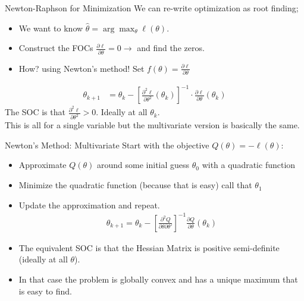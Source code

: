 \documentclass[aspectratio=169]{beamer}
\begin{document}
\begin{frame}{Newton-Raphson for Minimization}
We can re-write \alert{optimization} as \alert{root finding};
\begin{itemize}
\item We want to know $\hat{\theta} = \arg \max_{\theta} \ell(\theta)$.
\item Construct the FOCs $\frac{\partial \ell}{\partial \theta}=0 \rightarrow$  and find the zeros.
\item How? using Newton's method! Set $f(\theta) = \frac{\partial \ell}{\partial \theta}$
\end{itemize}
\begin{align*}
\theta_{k+1} &= \theta_k -  \left[ \frac{\partial^2 \ell}{\partial \theta^2}(\theta_k) \right]^{-1} \cdot \frac{\partial \ell}{\partial \theta}(\theta_k)
\end{align*}
The SOC is that $ \frac{\partial^2 \ell}{\partial \theta^2} >0$. Ideally at all $\theta_k$.\\
This is all for a \alert{single variable} but the \alert{multivariate} version is basically the same.
\end{frame}


\begin{frame}{Newton's Method: Multivariate}
Start with the objective $Q(\theta) = - \ell(\theta)$:
\begin{itemize}
\item Approximate $Q(\theta)$ around some initial guess $\theta_0$ with a quadratic function
\item Minimize the quadratic function (because that is easy) call that $\theta_1$
\item Update the approximation and repeat.
\begin{align*}
\theta_{k+1} = \theta_k - \left[ \frac{\partial^2 Q}{\partial \theta \partial \theta'} \right]^{-1}\frac{\partial Q}{\partial \theta}(\theta_k)
\end{align*}
\item The equivalent SOC is that the {Hessian Matrix} is \alert{positive semi-definite}  (ideally at all $\theta$).
\item In that case the problem is \alert{globally convex} and has a \alert{unique maximum} that is easy to find.
\end{itemize}
\end{frame}
\end{document}
